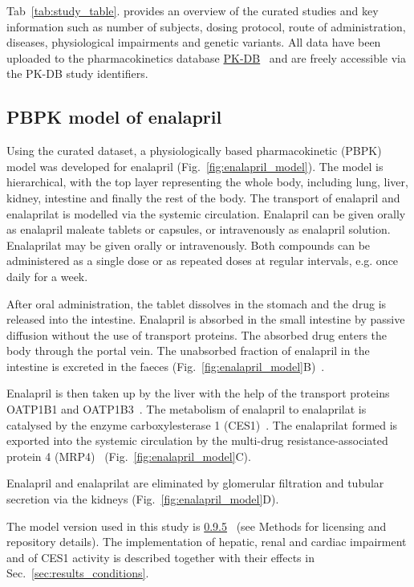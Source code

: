 Tab~\ref{tab:study_table}. provides an overview of the curated studies and key information such as number of subjects, dosing protocol, route of administration, diseases, physiological impairments and genetic variants. All data have been uploaded to the pharmacokinetics database \href{https://pk-db.com}{PK-DB}~\cite{Grzegorzewski2021} and are freely accessible via the PK-DB study identifiers.
\label{tab:study_table}
\subsection{PBPK model of enalapril}
\label{sec:results_model}
Using the curated dataset, a physiologically based pharmacokinetic (PBPK) model was developed for enalapril (Fig.~\ref{fig:enalapril_model}). The model is hierarchical, with the top layer representing the whole body, including lung, liver, kidney, intestine and finally the rest of the body. The transport of enalapril and enalaprilat is modelled via the systemic circulation. Enalapril can be given orally as enalapril maleate tablets or capsules, or intravenously as enalapril solution. Enalaprilat may be given orally or intravenously. Both compounds can be administered as a single dose or as repeated doses at regular intervals, e.g. once daily for a week. 

After oral administration, the tablet dissolves in the stomach and the drug is released into the intestine. Enalapril is absorbed in the small intestine by passive diffusion without the use of transport proteins. The absorbed drug enters the body through the portal vein. The unabsorbed fraction of enalapril in the intestine is excreted in the faeces (Fig.~\ref{fig:enalapril_model}B)~\cite{Knutter2008, Smeets2020a, Smeets2020}.

Enalapril is then taken up by the liver with the help of the transport proteins OATP1B1 and OATP1B3~\cite{Liu2006a}. The metabolism of enalapril to enalaprilat is catalysed by the enzyme carboxylesterase 1 (CES1)~\cite{Thomsen2014}. The enalaprilat formed is exported into the systemic circulation by the multi-drug resistance-associated protein 4 (MRP4)~\cite{Ferslew2014} (Fig.~\ref{fig:enalapril_model}C). 

Enalapril and enalaprilat are eliminated by glomerular filtration and tubular secretion via the kidneys (Fig.~\ref{fig:enalapril_model}D).

The model version used in this study is \href{https://zenodo.org/doi/10.5281/zenodo.11067564}{0.9.5}~\cite{enalapril-model-v0.9.5} (see Methods for licensing and repository details). The implementation of hepatic, renal and cardiac impairment and of CES1 activity is described together with their effects in Sec.~\ref{sec:results_conditions}.


